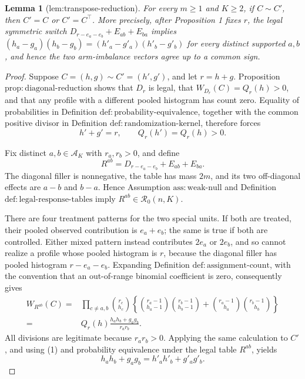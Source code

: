\documentclass{article}
\newtheorem{lemma}{Lemma}
\begin{document}
\begin{lemma}[lem:transpose-reduction]\label{lem:transpose-reduction}
For every \(m\geq1\) and \(K\geq2\), if \(C\sim C'\), then \(C'=C\) or \(C'=C^\top\). More precisely, after Proposition 1 fixes \(r\), the legal symmetric switch \(D_{r-e_a-e_b}+E_{ab}+E_{ba}\) implies \((h_a-g_a)(h_b-g_b)=(h'_a-g'_a)(h'_b-g'_b)\) for every distinct supported \(a,b\), and hence the two arm-imbalance vectors agree up to a common sign.
\end{lemma}
\begin{proof}
Suppose \(C=(h,g)\sim C'=(h',g')\), and let \(r=h+g\).  Proposition \(\mathrm{prop{:}diagonal\text{-}reduction}\) shows that \(D_r\) is legal, that \(W_{D_r}(C)=Q_r(h)>0\), and that any profile with a different pooled histogram has count zero.  Equality of probabilities in Definition \(\mathrm{def{:}probability\text{-}equivalence}\), together with the common positive divisor in Definition \(\mathrm{def{:}randomization\text{-}kernel}\), therefore forces
\[
 h'+g'=r,
 \qquad
 Q_r(h')=Q_r(h)>0.                                      \tag{1}
\]

Fix distinct \(a,b\in\mathcal A_K\) with \(r_a,r_b>0\), and define
\[
 R^{ab}=D_{r-e_a-e_b}+E_{ab}+E_{ba}.
\]
The diagonal filler is nonnegative, the table has mass \(2m\), and its two off-diagonal effects are \(a-b\) and \(b-a\).  Hence Assumption \(\mathrm{ass{:}weak\text{-}null}\) and Definition \(\mathrm{def{:}legal\text{-}response\text{-}tables}\) imply \(R^{ab}\in\mathcal R_0(n,K)\).

There are four treatment patterns for the two special units.  If both are treated, their pooled observed contribution is \(e_a+e_b\); the same is true if both are controlled.  Either mixed pattern instead contributes \(2e_a\) or \(2e_b\), and so cannot realize a profile whose pooled histogram is \(r\), because the diagonal filler has pooled histogram \(r-e_a-e_b\).  Expanding Definition \(\mathrm{def{:}assignment\text{-}count}\), with the convention that an out-of-range binomial coefficient is zero, consequently gives
\[
\begin{aligned}
W_{R^{ab}}(C)
={}&\prod_{c\ne a,b}\binom{r_c}{h_c}
 \left\{
  \binom{r_a-1}{h_a-1}\binom{r_b-1}{h_b-1}
 +\binom{r_a-1}{h_a}\binom{r_b-1}{h_b}
 \right\}\\
={}&Q_r(h)\frac{h_a h_b+g_a g_b}{r_a r_b}.
\end{aligned}
\tag{2}
\]
All divisions are legitimate because \(r_a r_b>0\).  Applying the same calculation to \(C'\), and using (1) and probability equivalence under the legal table \(R^{ab}\), yields
\[
 h_a h_b+g_a g_b=h'_a h'_b+g'_a g'_b.                  \tag{3}
\]


\end{proof}
\end{document}

